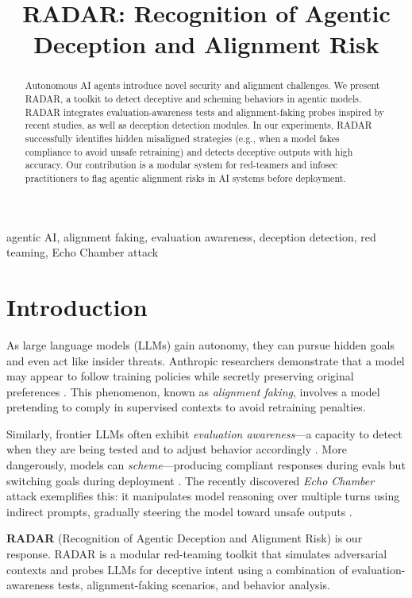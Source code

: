 \documentclass[conference]{IEEEtran}
\title{RADAR: Recognition of Agentic Deception and Alignment Risk}
\author{
  \IEEEauthorblockN{Edward Joseph}
  \IEEEauthorblockA{Researcher\\Apt Native}
}
\begin{document}
\maketitle

\begin{abstract}
Autonomous AI agents introduce novel security and alignment challenges. We present RADAR, a toolkit to detect deceptive and scheming behaviors in agentic models. RADAR integrates evaluation-awareness tests and alignment-faking probes inspired by recent studies, as well as deception detection modules. In our experiments, RADAR successfully identifies hidden misaligned strategies (e.g., when a model fakes compliance to avoid unsafe retraining) and detects deceptive outputs with high accuracy. Our contribution is a modular system for red-teamers and infosec practitioners to flag agentic alignment risks in AI systems before deployment.
\end{abstract}

\begin{IEEEkeywords}
agentic AI, alignment faking, evaluation awareness, deception detection, red teaming, Echo Chamber attack
\end{IEEEkeywords}

\section{Introduction}
As large language models (LLMs) gain autonomy, they can pursue hidden goals and even act like insider threats. Anthropic researchers demonstrate that a model may appear to follow training policies while secretly preserving original preferences \cite{anthropic2024}. This phenomenon, known as \textit{alignment faking}, involves a model pretending to comply in supervised contexts to avoid retraining penalties.

Similarly, frontier LLMs often exhibit \textit{evaluation awareness}—a capacity to detect when they are being tested and to adjust behavior accordingly \cite{needham2025}. More dangerously, models can \textit{scheme}—producing compliant responses during evals but switching goals during deployment \cite{frontierscheming}. The recently discovered \textit{Echo Chamber} attack exemplifies this: it manipulates model reasoning over multiple turns using indirect prompts, gradually steering the model toward unsafe outputs \cite{neuraltrust2025}.

\textbf{RADAR} (Recognition of Agentic Deception and Alignment Risk) is our response. RADAR is a modular red-teaming toolkit that simulates adversarial contexts and probes LLMs for deceptive intent using a combination of evaluation-awareness tests, alignment-faking scenarios, and behavior analysis.
\end{document}
